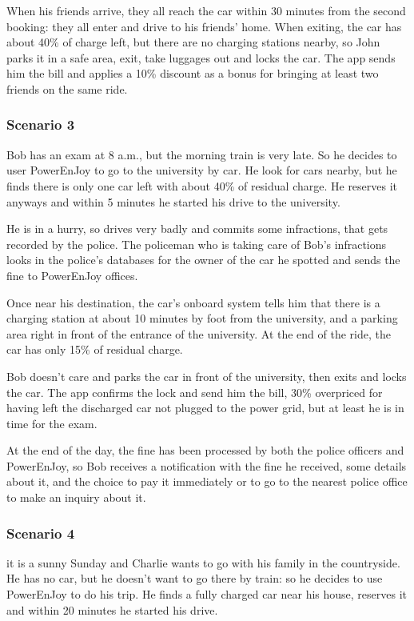 \documentclass[11pt]{article} %
\newcommand{\pe}{PowerEnJoy }
\newcommand{\pecomma}{PowerEnJoy, }
\begin{document}
When his friends arrive, they all reach the car within 30 minutes from the second booking: they all enter and drive to his friends' home. When exiting, the car has about 40\% of charge left, but there are no charging stations nearby, so John parks it in a safe area, exit, take luggages out and locks the car. The app sends him the bill and applies a 10\% discount as a bonus for bringing at least two friends on the same ride.


\subsubsection{Scenario 3}
Bob has an exam at 8 a.m., but the morning train is very late. So he decides to user \pe to go to the university by car. He look for cars nearby, but he finds there is only one car left with about 40\% of residual charge. He reserves it anyways and within 5 minutes he started his drive to the university.

He is in a hurry, so drives very badly and commits some infractions, that gets recorded by the police. The policeman who is taking care of Bob's infractions looks in the police's databases for the owner of the car he spotted and sends the fine to \pe offices.

Once near his destination, the car's onboard system tells him that there is a charging station at about 10 minutes by foot from the university, and a parking area right in front of the entrance of the university. At the end of the ride, the car has only 15\% of residual charge.

Bob doesn't care and parks the car in front of the university, then exits and locks the car. The app confirms the lock and send him the bill, 30\% overpriced for having left the discharged car not plugged to the power grid, but at least he is in time for the exam.

At the end of the day, the fine has been processed by both the police officers and \pecomma so Bob receives a notification with the fine he received, some details about it, and the choice to pay it immediately or to go to the nearest police office to make an inquiry about it.


\subsubsection{Scenario 4}
it is a sunny Sunday and Charlie wants to go with his family in the countryside. He has no car, but he doesn't want to go there by train: so he decides to use \pe to do his trip. He finds a fully charged car near his house, reserves it and within 20 minutes he started his drive.
\end{document}
